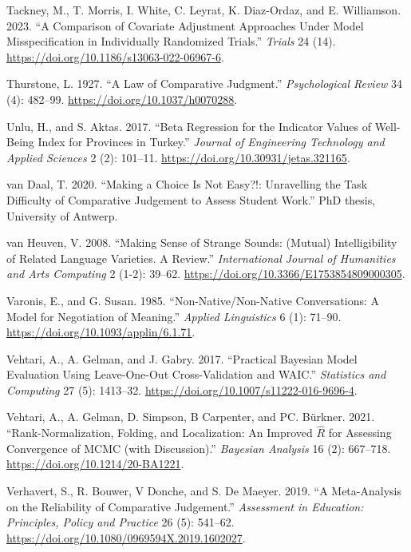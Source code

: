 \documentclass[
sn-apacite
]{sn-jnl}
\newlength{\cslhangindent}
\newenvironment{CSLReferences}[2] %
 {\begin{list}{}{%
  \setlength{\itemindent}{0pt}
  \setlength{\leftmargin}{0pt}
  \setlength{\parsep}{0pt}
  \ifodd #1
   \setlength{\leftmargin}{\cslhangindent}
   \setlength{\itemindent}{-1\cslhangindent}
  \fi
  \setlength{\itemsep}{#2\baselineskip}}}
 {\end{list}}
\begin{document}
\begin{CSLReferences}{1}{0}
Tackney, M., T. Morris, I. White, C. Leyrat, K. Diaz-Ordaz, and E.
Williamson. 2023. {``A Comparison of Covariate Adjustment Approaches
Under Model Misspecification in Individually Randomized Trials.''}
\emph{Trials} 24 (14). \url{https://doi.org/10.1186/s13063-022-06967-6}.

Thurstone, L. 1927. {``A Law of Comparative Judgment.''}
\emph{Psychological Review} 34 (4): 482--99.
\url{https://doi.org/10.1037/h0070288}.

Unlu, H., and S. Aktas. 2017. {``Beta Regression for the Indicator
Values of Well-Being Index for Provinces in Turkey.''} \emph{Journal of
Engineering Technology and Applied Sciences} 2 (2): 101--11.
\url{https://doi.org/10.30931/jetas.321165}.

van Daal, T. 2020. {``Making a Choice Is Not Easy?!: Unravelling the
Task Difficulty of Comparative Judgement to Assess Student Work.''} PhD
thesis, University of Antwerp.

van Heuven, V. 2008. {``Making Sense of Strange Sounds: (Mutual)
Intelligibility of Related Language Varieties. A Review.''}
\emph{International Journal of Humanities and Arts Computing} 2 (1-2):
39--62. \url{https://doi.org/10.3366/E1753854809000305}.

Varonis, E., and G. Susan. 1985. {``Non-Native/Non-Native Conversations:
A Model for Negotiation of Meaning.''} \emph{Applied Linguistics} 6 (1):
71--90. \url{https://doi.org/10.1093/applin/6.1.71}.

Vehtari, A., A. Gelman, and J. Gabry. 2017. {``Practical Bayesian Model
Evaluation Using Leave-One-Out Cross-Validation and WAIC.''}
\emph{Statistics and Computing} 27 (5): 1413--32.
\url{https://doi.org/10.1007/s11222-016-9696-4}.

Vehtari, A., A. Gelman, D. Simpson, B Carpenter, and PC. Bürkner. 2021.
{``{Rank-Normalization, Folding, and Localization: An Improved
\(\widehat{R}\) for Assessing Convergence of MCMC (with Discussion)}.''}
\emph{Bayesian Analysis} 16 (2): 667--718.
\url{https://doi.org/10.1214/20-BA1221}.

Verhavert, S., R. Bouwer, V Donche, and S. De Maeyer. 2019. {``A
Meta-Analysis on the Reliability of Comparative Judgement.''}
\emph{Assessment in Education: Principles, Policy and Practice} 26 (5):
541--62. \url{https://doi.org/10.1080/0969594X.2019.1602027}.


\end{CSLReferences}
\end{document}
